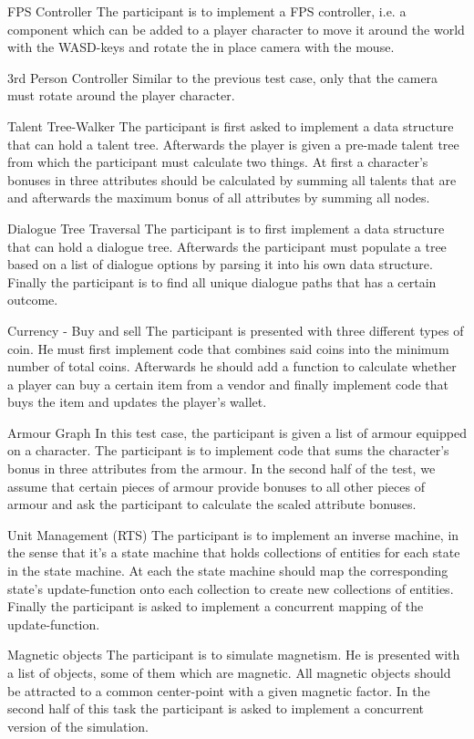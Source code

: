 \begin{labeling}{\quad\quad}
    \item[FPS Controller] The participant is to implement a \gls{FPS} controller, i.e. a component which can be added to a player character to move it around the world with the WASD-keys and rotate the in place camera with the mouse.
    \item[3rd Person Controller] Similar to the previous test case, only that the camera must rotate around the player character.
    \item[Talent Tree-Walker] The participant is first asked to implement a data structure that can hold a talent tree. Afterwards the player is given a pre-made talent tree from which the participant must calculate two things. At first a character's bonuses in three attributes should be calculated by summing all talents that are  and afterwards the maximum bonus of all attributes by summing all nodes.
    \item[Dialogue Tree Traversal] The participant is to first implement a data structure that can hold a dialogue tree. Afterwards the participant must populate a tree based on a list of dialogue options by parsing it into his own data structure. Finally the participant is to find all unique dialogue paths that has a certain outcome. 
    \item[Currency - Buy and sell] The participant is presented with three different types of coin. He must first implement code that combines said coins into the minimum number of total coins. Afterwards he should add a function to calculate whether a player can buy a certain item from a vendor and finally implement code that buys the item and updates the player's wallet. 
    \item[Armour Graph] In this test case, the participant is given a list of armour equipped on a character. The participant is to implement code that sums the character's bonus in three attributes from the armour. In the second half of the test, we assume that certain pieces of armour provide bonuses to all other pieces of armour and ask the participant to calculate the scaled attribute bonuses.
    \item[Unit Management (RTS)] The participant is to implement an inverse machine, in the sense that it's a state machine that holds collections of entities for each state in the state machine. At each  the state machine should map the corresponding state's update-function onto each collection to create new collections of entities. Finally the participant is asked to implement a concurrent mapping of the update-function.
    \item[Magnetic objects] The participant is to simulate magnetism. He is presented with a list of objects, some of them which are magnetic. All magnetic objects should be attracted to a common center-point with a given magnetic factor. In the second half of this task the participant is asked to implement a concurrent version of the simulation.
\end{labeling}


